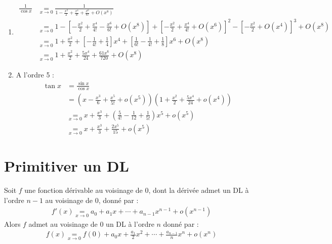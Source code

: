 \documentclass[../main.tex]{subfiles}
\begin{document}
\begin{enumerate}
    \item \begin{align*}
        \frac{1}{\cos x} &\underset{x\to 0}{=} \frac{1}{1 - \frac{x^2}{2} + \frac{x^4}{4!} + \frac{x^6}{6!} + O(x^8)} \\
        &\underset{x\to 0}{=} 1 - \left[ -\frac{x^2}{2} + \frac{x^4}{4!} - \frac{x^6}{6!} + O(x^8) \right] + \left[ -\frac{x^2}{2} + \frac{x^4}{4!} + O(x^6) \right]^2 - \left[ -\frac{x^2}{2} + O(x^4) \right]^3 + O(x^8) \\
        &\underset{x\to 0}{=} 1 + \frac{x^2}{2} + \left[ -\frac{1}{4!} + \frac{1}{4} \right] x^4 + \left[ \frac{1}{6!} - \frac{1}{4!} + \frac{1}{8} \right] x^6 + O(x^8) \\
        &\underset{x\to 0}{=} 1 + \frac{x^2}{2} + \frac{5x^4}{24} + \frac{61x^6}{720} + O(x^8)
    \end{align*}

    \item A l'ordre 5 :
    \begin{align*}
        \tan x &= \frac{\sin x}{\cos x} \\
        &= \left( x - \frac{x^3}{6} + \frac{x^5}{5!} + o(x^5) \right) \left( 1 + \frac{x^2}{2} + \frac{5x^4}{24} + o(x^4) \right) \\
        &\underset{x\to 0}{=} x + \frac{x^3}{3} + \left( \frac{5}{4!} - \frac{1}{12} + \frac{1}{5!} \right) x^5 + o(x^5) \\
        &\underset{x\to 0}{=} x + \frac{x^3}{3} + \frac{2x^5}{15} + o(x^5)
    \end{align*}
\end{enumerate}

\section{Primitiver un DL}
\begin{tcolorbox}[title=Propostion 25.70, title filled=false, colframe=lightblue, colback=lightblue!10!white]
    Soit $f$ une fonction dérivable au voisinage de $0$, dont la dérivée admet un DL à l'ordre $n-1$ au voisinage de $0$, donné par : 
    \begin{align*}
        f'(x) \underset{x\to 0}{=} a_0 + a_1 x + \cdots + a_{n-1} x^{n-1} + o(x^{n-1})
    \end{align*}
    Alors $f$ admet au voisinage de $0$ un DL à l'ordre $n$ donné par :
    \begin{align*}
        f(x) \underset{x\to 0}{=} f(0) + a_0 x + \frac{a_1}{2} x^2 + \cdots + \frac{a_{n-1}}{n} x^n + o(x^n)
    \end{align*}
\end{tcolorbox}
\end{document}
